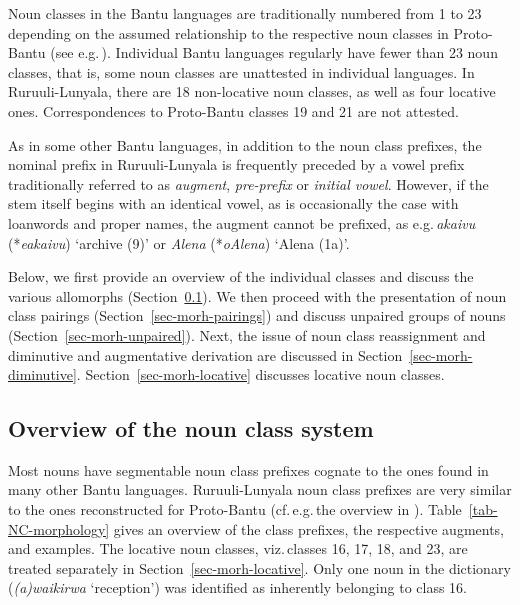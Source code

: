 Noun classes in the Bantu languages are traditionally numbered from 1 to 23 depending on the assumed relationship to the respective noun classes in Proto-Bantu (see e.g.\,\citealt{Vandeveldeetal2019Nominal}). 
Individual Bantu languages regularly have fewer than 23 noun classes, that is, some noun classes are unattested in individual languages. 
In Ru\-ruu\-li-Lu\-nya\-la, there are 18 non-locative noun classes, as well as four locative ones. Correspondences to Proto-Bantu classes 19 and 21 are not attested. 

As in some other Bantu languages, in addition to the noun class prefixes, the nominal prefix in Ru\-ruu\-li\hyp{}Lu\-nya\-la is frequently preceded by a vowel prefix traditionally referred to as \textit{augment}, \textit{pre-prefix} or \textit{initial vowel}. 
However, if the stem itself begins with an identical vowel, as is occasionally the case with loanwords and proper names, the augment cannot be prefixed, as e.g.\,\textit{akaivu} (*\textit{eakaivu}) `archive (9)' or \textit{Alena} (*\textit{oAlena}) `Alena (1a)'.

Below, we first provide an overview of the individual classes and discuss the various allomorphs (Section~\ref{sec-morh-noun-classes-overview}). 
We  then proceed with the presentation of noun class pairings (Section~\ref{sec-morh-pairings}) and discuss unpaired groups of nouns (Section~\ref{sec-morh-unpaired}). 
Next, the issue of noun class reassignment and diminutive and augmentative derivation are discussed in Section~\ref{sec-morh-diminutive}. 
Section~\ref{sec-morh-locative} discusses locative noun classes.


\subsection{Overview of the noun class system}\label{sec-morh-noun-classes-overview}

Most nouns have segmentable noun class prefixes cognate to the ones found in many other Bantu languages. Ru\-ruu\-li\hyp{}Lu\-nya\-la noun class prefixes are very similar to the ones reconstructed for Proto-Bantu (cf.\,e.g.\,the overview in \citealt[247]{Maho1999Comparative}). 
Table~\ref{tab-NC-morphology} gives an overview of the class prefixes, the respective augments, and  examples. 
The locative noun classes, viz.\,classes 16, 17, 18, and 23, are treated separately in Section~\ref{sec-morh-locative}. 
Only one noun in the dictionary (\textit{(a)waikirwa} `reception') was identified as inherently belonging to class 16.


